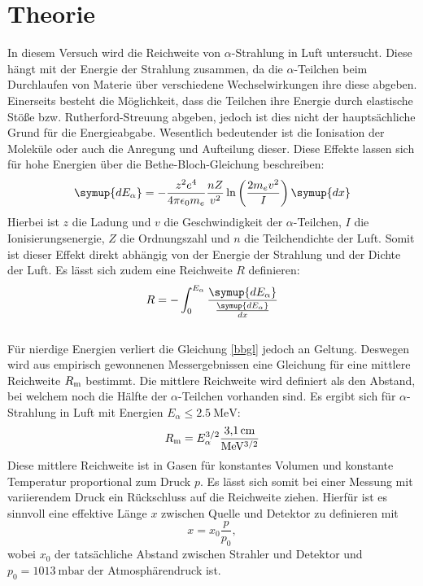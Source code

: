 \section{Theorie}
\label{sec:Theorie}
In diesem Versuch wird die Reichweite von $\alpha$-Strahlung in Luft untersucht.
Diese hängt mit der Energie der Strahlung zusammen, da die $\alpha$-Teilchen beim Durchlaufen von Materie über verschiedene Wechselwirkungen ihre diese abgeben.
Einerseits besteht die Möglichkeit, dass die Teilchen ihre Energie durch elastische Stöße bzw. Rutherford-Streuung abgeben, jedoch ist dies nicht der hauptsächliche Grund für die Energieabgabe.
Wesentlich bedeutender ist die Ionisation der Moleküle oder auch die Anregung und Aufteilung dieser. Diese Effekte lassen sich für hohe Energien über die Bethe-Bloch-Gleichung beschreiben:
\begin{equation}
	\label{bbgl}
	\symup{dE_\alpha} = -\frac{z^2e^4}{4\pi\epsilon_0m_e} \frac{nZ}{v^2} \ln\left(\frac{2m_ev^2}{I}\right) \symup{dx}
\end{equation}
Hierbei ist $z$ die Ladung und $v$ die Geschwindigkeit der $\alpha$-Teilchen, $I$ die Ionisierungsenergie, $Z$ die Ordnungszahl und $n$ die Teilchendichte der Luft.
Somit ist dieser Effekt direkt abhängig von der Energie der Strahlung und der Dichte der Luft.
Es lässt sich zudem eine Reichweite $R$ definieren:
\begin{equation}
	\label{R}
	R=-\int_0^{E_\alpha}\frac{\symup{dE_\alpha}}{\frac{\symup{dE_\alpha}}{dx}}
\end{equation}
\\
Für nierdige Energien verliert die Gleichung \eqref{bbgl} jedoch an Geltung. Deswegen wird aus empirisch gewonnenen Messergebnissen eine Gleichung für eine mittlere Reichweite $R_\text m$ bestimmt.
Die mittlere Reichweite wird definiert als den Abstand, bei welchem noch die Hälfte der $\alpha$-Teilchen vorhanden sind.
Es ergibt sich für $\alpha$-Strahlung in Luft mit Energien $E_\alpha \le \SI{2.5}{\mega\electronvolt}$:
\begin{equation}
	\label{Rm}
	R_\text m = E_\alpha^{3/2} \frac{\SI{3.1}{\centi\meter}}{\si{\mega\electronvolt}^{3/2}}
\end{equation}
Diese mittlere Reichweite ist in Gasen für konstantes Volumen und konstante Temperatur proportional zum Druck $p$.
Es lässt sich somit bei einer Messung mit variierendem Druck ein Rückschluss auf die Reichweite ziehen.
Hierfür ist es sinnvoll eine effektive Länge $x$ zwischen Quelle und Detektor zu definieren mit
\begin{equation}
	\label{xeff}
	x = x_0\frac{p}{p_0},
\end{equation}
wobei $x_0$ der tatsächliche Abstand zwischen Strahler und Detektor und $p_0 = \SI{1013}{\milli\bar}$\cite{v701} der Atmosphärendruck ist.
